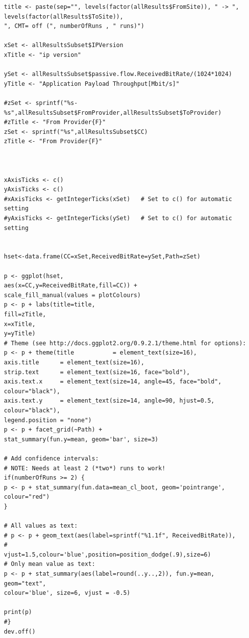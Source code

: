 \documentclass[a4paper,12pt]{ctexbook}
\begin{document}
\begin{flushleft}
\begin{verbatim}
title <- paste(sep="", levels(factor(allResults$FromSite)), " -> ", levels(factor(allResults$ToSite)),
", CMT= off (", numberOfRuns , " runs)")

xSet <- allResultsSubset$IPVersion
xTitle <- "ip version"

ySet <- allResultsSubset$passive.flow.ReceivedBitRate/(1024*1024)
yTitle <- "Application Payload Throughput[Mbit/s]"

#zSet <- sprintf("%s-%s",allResultsSubset$FromProvider,allResultsSubset$ToProvider)
#zTitle <- "From Provider{F}"
zSet <- sprintf("%s",allResultsSubset$CC)
zTitle <- "From Provider{F}"



xAxisTicks <- c()
yAxisTicks <- c()
#xAxisTicks <- getIntegerTicks(xSet)   # Set to c() for automatic setting
#yAxisTicks <- getIntegerTicks(ySet)   # Set to c() for automatic setting


hset<-data.frame(CC=xSet,ReceivedBitRate=ySet,Path=zSet)

p <- ggplot(hset,
aes(x=CC,y=ReceivedBitRate,fill=CC)) +
scale_fill_manual(values = plotColours)
p <- p + labs(title=title,
fill=zTitle,
x=xTitle,
y=yTitle)
# Theme (see http://docs.ggplot2.org/0.9.2.1/theme.html for options):
p <- p + theme(title           = element_text(size=16),
axis.title      = element_text(size=16),
strip.text      = element_text(size=16, face="bold"),
axis.text.x     = element_text(size=14, angle=45, face="bold", colour="black"),
axis.text.y     = element_text(size=14, angle=90, hjust=0.5, colour="black"),
legend.position = "none")
p <- p + facet_grid(~Path) + 
stat_summary(fun.y=mean, geom='bar', size=3)

# Add confidence intervals:
# NOTE: Needs at least 2 (*two*) runs to work!
if(numberOfRuns >= 2) {
p <- p + stat_summary(fun.data=mean_cl_boot, geom='pointrange', colour="red")
}

# All values as text:
# p <- p + geom_text(aes(label=sprintf("%1.1f", ReceivedBitRate)),
#                    vjust=1.5,colour='blue',position=position_dodge(.9),size=6)
# Only mean value as text:
p <- p + stat_summary(aes(label=round(..y..,2)), fun.y=mean, geom="text",
colour='blue', size=6, vjust = -0.5)

print(p)
#}
dev.off()	
\end{verbatim}



\end{flushleft}
\end{document}
